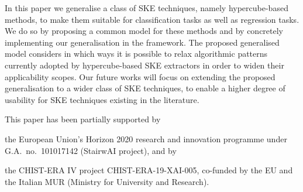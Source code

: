 \documentclass[
]{ceurart}
\begin{document}
In this paper we generalise a class of SKE techniques, namely hypercube-based methods, to make them suitable for classification tasks as well as regression tasks.
%
We do so by proposing a common model for these methods and by concretely implementing our generalisation in the \psyke{} framework.
%
The proposed generalised model considers in which ways it is possible to relax algorithmic patterns currently adopted by hypercube-based SKE extractors in order to widen their applicability scopes.
%
Our future works will focus on extending the proposed generalisation to a wider class of SKE techniques, to enable a higher degree of usability for SKE techniques existing in the literature.

\begin{acknowledgments}
	This paper has been partially supported by
	\begin{inlinelist}
		\item the European Union's Horizon 2020 research and innovation programme under G.A.\ no.\ 101017142 (StairwAI project), and by
		\item the CHIST-ERA IV project CHIST-ERA-19-XAI-005, co-funded by the EU and the Italian MUR (Ministry for University and Research).
	\end{inlinelist}
\end{acknowledgments}


\end{document}
